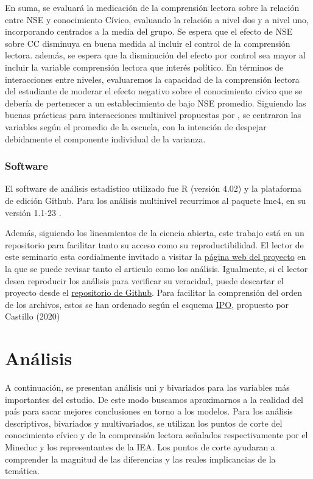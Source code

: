 \documentclass[12pt,twoside]{templates/facsothesis}
\begin{document}
En suma, se evaluará la medicación de la comprensión lectora sobre la relación entre NSE y conocimiento Cívico, evaluando la relación a nivel dos y a nivel uno, incorporando centrados a la media del grupo. Se espera que el efecto de NSE sobre CC disminuya en buena medida al incluir el control de la comprensión lectora. además, se espera que la disminución del efecto por control sea mayor al incluir la variable comprensión lectora que interés político.
En términos de interacciones entre niveles, evaluaremos la capacidad de la comprensión lectora del estudiante de moderar el efecto negativo sobre el conocimiento cívico que se debería de pertenecer a un establecimiento de bajo NSE promedio. Siguiendo las buenas prácticas para interacciones multinivel propuestas por \citep{aguinisBestPracticeRecommendationsEstimating2013}, se centraron las variables según el promedio de la escuela, con la intención de despejar debidamente el componente individual de la varianza.

\hypertarget{software}{%
\subsection{Software}\label{software}}

El software de análisis estadístico utilizado fue R (versión 4.02) y la plataforma de edición Github. Para los análisis multinivel recurrimos al paquete lme4, en su versión 1.1-23 \citep{batesPackageLme42020}.

Además, siguiendo los lineamientos de la ciencia abierta, este trabajo está en un repositorio para facilitar tanto su acceso como su reproductibilidad. El lector de este seminario esta cordialmente invitado a visitar la \href{https://franciscomeneses.github.io/Seminario/docs/index.html}{página web del proyecto} en la que se puede revisar tanto el articulo como los análisis. Igualmente, si el lector desea reproducir los análisis para verificar su veracidad, puede descartar el proyecto desde el \href{https://github.com/franciscomeneses/Seminario}{repositorio de Github}. Para facilitar la comprensión del orden de los archivos, estos se han ordenado según el esquema \href{https://juancarloscastillo.github.io/ipo/}{IPO}, propuesto por Castillo (2020)

\hypertarget{anuxe1lisis}{%
\chapter{Análisis}\label{anuxe1lisis}}

A continuación, se presentan análisis uni y bivariados para las variables más importantes del estudio. De este modo buscamos aproximarnos a la realidad del país para sacar mejores conclusiones en torno a los modelos. Para los análisis descriptivos, bivariados y multivariados, se utilizan los puntos de corte del conocimiento cívico y de la comprensión lectora señalados respectivamente por el Mineduc y los representantes de la IEA. Los puntos de corte ayudaran a comprender la magnitud de las diferencias y las reales implicancias de la temática.
\end{document}
